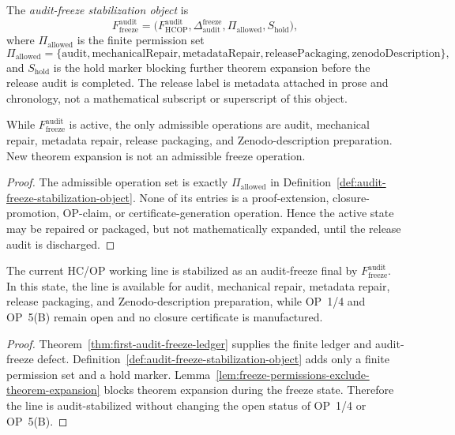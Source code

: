 \begin{definition}
\label{def:audit-freeze-stabilization-object}
The \emph{audit-freeze stabilization object} is
\[
 F_{\mathrm{freeze}}^{\mathrm{audit}}
 =
 \bigl(
 F_{\mathrm{HCOP}}^{\mathrm{audit}},
 \Delta_{\mathrm{audit}}^{\mathrm{freeze}},
 \Pi_{\mathrm{allowed}},
 S_{\mathrm{hold}}
 \bigr),
\]
where \(\Pi_{\mathrm{allowed}}\) is the finite permission set
\[
 \Pi_{\mathrm{allowed}}
 =
 \{\mathrm{audit},\mathrm{mechanicalRepair},\mathrm{metadataRepair},
 \mathrm{releasePackaging},\mathrm{zenodoDescription}\},
\]
and \(S_{\mathrm{hold}}\) is the hold marker blocking further theorem expansion before the release audit is completed. The release label is metadata attached in prose and chronology, not a mathematical subscript or superscript of this object.
\end{definition}

\begin{lemma}
\label{lem:freeze-permissions-exclude-theorem-expansion}
While \(F_{\mathrm{freeze}}^{\mathrm{audit}}\) is active, the only admissible operations are audit, mechanical repair, metadata repair, release packaging, and Zenodo-description preparation. New theorem expansion is not an admissible freeze operation.
\end{lemma}

\begin{proof}
The admissible operation set is exactly \(\Pi_{\mathrm{allowed}}\) in Definition~\ref{def:audit-freeze-stabilization-object}. None of its entries is a proof-extension, closure-promotion, OP-claim, or certificate-generation operation. Hence the active state may be repaired or packaged, but not mathematically expanded, until the release audit is discharged.
\end{proof}

\begin{theorem}
\label{thm:audit-freeze-stabilization}
The current HC/OP working line is stabilized as an audit-freeze final by \(F_{\mathrm{freeze}}^{\mathrm{audit}}\). In this state, the line is available for audit, mechanical repair, metadata repair, release packaging, and Zenodo-description preparation, while OP~1/4 and OP~5(B) remain open and no closure certificate is manufactured.
\end{theorem}

\begin{proof}
Theorem~\ref{thm:first-audit-freeze-ledger} supplies the finite ledger and audit-freeze defect. Definition~\ref{def:audit-freeze-stabilization-object} adds only a finite permission set and a hold marker. Lemma~\ref{lem:freeze-permissions-exclude-theorem-expansion} blocks theorem expansion during the freeze state. Therefore the line is audit-stabilized without changing the open status of OP~1/4 or OP~5(B).
\end{proof}

